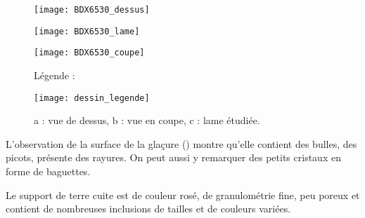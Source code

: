 \begin{figure}[htb]
  \begin{minipage}[t]{0.5\textwidth}
    \centerfloat
    \vspace*{0pt}
    \texttt{[image: BDX6530\_dessus]}
  \end{minipage}%
  \quad%
  \begin{minipage}[t]{0.5\textwidth}
    \centerfloat
    \vspace*{0pt}
    \texttt{[image: BDX6530\_lame]}
  \end{minipage}

  \bigskip

  \begin{minipage}[t]{0.5\textwidth}
    \centerfloat
    \vspace*{0pt}
    \texttt{[image: BDX6530\_coupe]}
  \end{minipage}%
  \quad%
  \begin{minipage}[t]{0.5\textwidth}
    \vspace*{0pt}
    Légende :

    \texttt{[image: dessin\_legende]}
  \end{minipage}
  \caption{\legendeB 
           a : vue de dessus, b : vue en coupe, c : lame étudiée.}
  \label{dessin:6530}
\end{figure}

L'observation de la surface de la glaçure () montre 
qu'elle contient des bulles, des picots, présente des rayures. On peut 
aussi y remarquer des petits cristaux en forme de baguettes.

Le support de terre cuite est de couleur rosé, de granulométrie fine, 
peu poreux et contient de nombreuses inclusions de tailles et de 
couleurs variées.

